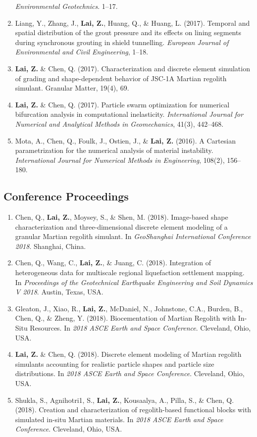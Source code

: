 \documentclass[11pt,]{elsarticle}
\providecommand{\tightlist}{%
  \setlength{\itemsep}{0pt}\setlength{\parskip}{0pt}}
\begin{document}
\begin{enumerate}
  \emph{Environmental Geotechnics}. 1--17.
\item
  Liang, Y., Zhang, J., \textbf{Lai, Z.}, Huang, Q., \& Huang, L.
  (2017). Temporal and spatial distribution of the grout pressure and
  its effects on lining segments during synchronous grouting in shield
  tunnelling. \emph{European Journal of Environmental and Civil
  Engineering}, 1--18.
\item
  \textbf{Lai, Z.} \& Chen, Q. (2017). Characterization and discrete
  element simulation of grading and shape-dependent behavior of JSC-1A
  Martian regolith simulant. Granular Matter, 19(4), 69.
\item
  \textbf{Lai, Z.} \& Chen, Q. (2017). Particle swarm optimization for
  numerical bifurcation analysis in computational inelasticity.
  \emph{International Journal for Numerical and Analytical Methods in
  Geomechanics}, 41(3), 442--468.
\item
  Mota, A., Chen, Q., Foulk, J., Ostien, J., \& \textbf{Lai, Z.} (2016).
  A Cartesian parametrization for the numerical analysis of material
  instability. \emph{International Journal for Numerical Methods in
  Engineering}, 108(2), 156--180.
\end{enumerate}

\hypertarget{conference-proceedings}{%
\subsection{Conference Proceedings}\label{conference-proceedings}}

\begin{enumerate}
\def\labelenumi{\arabic{enumi}.}
\tightlist
\item
  Chen, Q., \textbf{Lai, Z.}, Moysey, S., \& Shen, M. (2018).
  Image-based shape characterization and three-dimensional discrete
  element modeling of a granular Martian regolith simulant. In
  \emph{GeoShanghai International Conference 2018}. Shanghai, China.
\item
  Chen, Q., Wang, C., \textbf{Lai, Z.}, \& Juang, C. (2018). Integration
  of heterogeneous data for multiscale regional liquefaction settlement
  mapping. In \emph{Proceedings of the Geotechnical Earthquake
  Engineering and Soil Dynamics V 2018}. Austin, Texas, USA.
\item
  Gleaton, J., Xiao, R., \textbf{Lai, Z.}, McDaniel, N., Johnstone,
  C.A., Burden, B., Chen, Q., \& Zheng, Y. (2018). Biocementation of
  Martian Regolith with In-Situ Resources. In \emph{2018 ASCE Earth and
  Space Conference}. Cleveland, Ohio, USA.
\item
  \textbf{Lai, Z.} \& Chen, Q. (2018). Discrete element modeling of
  Martian regolith simulants accounting for realistic particle shapes
  and particle size distributions. In \emph{2018 ASCE Earth and Space
  Conference}. Cleveland, Ohio, USA.
\item
  Shukla, S., Agnihotri1, S., \textbf{Lai, Z.}, Kousaalya, A., Pilla,
  S., \& Chen, Q. (2018). Creation and characterization of
  regolith-based functional blocks with simulated in-situ Martian
  materials. In \emph{2018 ASCE Earth and Space Conference}. Cleveland,
  Ohio, USA.
\end{enumerate}
\end{document}
